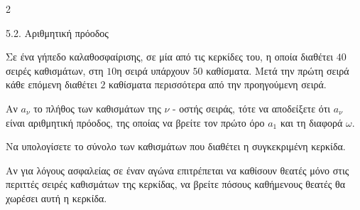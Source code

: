 \begin{ylh}{2}
    \item 5.2. Αριθμητική πρόοδος
\end{ylh}
Σε ένα γήπεδο καλαθοσφαίρισης, σε μία από τις κερκίδες του, η οποία διαθέτει $40$ σειρές καθισμάτων, στη $10$η σειρά υπάρχουν $50$ καθίσματα. Μετά την πρώτη σειρά κάθε επόμενη διαθέτει $2$ καθίσματα περισσότερα από την προηγούμενη σειρά.
\begin{alist}
\item Αν $a_{\nu}$ το πλήθος των καθισμάτων της $\nu$ - οστής σειράς, τότε να αποδείξετε ότι $a_{\nu}$ είναι αριθμητική πρόοδος, της οποίας να βρείτε τον πρώτο όρο $a_{1}$ και τη διαφορά $\omega\text{.}$
\item Να υπολογίσετε το σύνολο των καθισμάτων που διαθέτει η συγκεκριμένη κερκίδα.

\item Αν για λόγους ασφαλείας σε έναν αγώνα επιτρέπεται να καθίσουν θεατές μόνο στις περιττές σειρές καθισμάτων της κερκίδας, να βρείτε πόσους καθήμενους θεατές θα χωρέσει αυτή η κερκίδα.
\end{alist}

